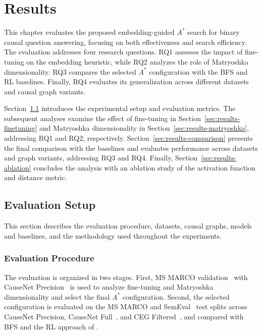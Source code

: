 \chapter{Results}
\label{chap:results}

This chapter evaluates the proposed embedding-guided $A^*$ search for binary causal question answering, focusing on both effectiveness and search efficiency. The evaluation addresses four research questions. RQ1 assesses the impact of fine-tuning on the embedding heuristic, while RQ2 analyzes the role of Matryoshka dimensionality. RQ3 compares the selected $A^*$ configuration with the BFS and RL baselines. Finally, RQ4 evaluates its generalization across different datasets and causal graph variants.

Section~\ref{sec:results-evaluation-setup} introduces the experimental setup and evaluation metrics. The subsequent analyses examine the effect of fine-tuning in Section~\ref{sec:results-finetuning} and Matryoshka dimensionality in Section~\ref{sec:results-matryoshka}, addressing RQ1 and RQ2, respectively. Section~\ref{sec:results-comparison} presents the final comparison with the baselines and evaluates performance across datasets and graph variants, addressing RQ3 and RQ4. Finally, Section~\ref{sec:results-ablation} concludes the analysis with an ablation study of the activation function and distance metric.

\section{Evaluation Setup}
\label{sec:results-evaluation-setup}

This section describes the evaluation procedure, datasets, causal graphs, models and baselines, and the methodology used throughout the experiments.

\subsection{Evaluation Procedure}
\label{sec:results-procedure}

The evaluation is organized in two stages. First, MS MARCO validation~\citep{nguyen:2016,bluebaum:2024} with CauseNet Precision~\citep{heindorf:2020} is used to analyze fine-tuning and Matryoshka dimensionality and select the final $A^*$ configuration. Second, the selected configuration is evaluated on the MS MARCO and SemEval~\citep{hendrickx:2010,sharp:2016,bluebaum:2024} test splits across CauseNet Precision, CauseNet Full~\citep{heindorf:2020}, and CEG Filtered~\citep{li:2020}, and compared with BFS and the RL approach of \citet{bluebaum:2024}.

